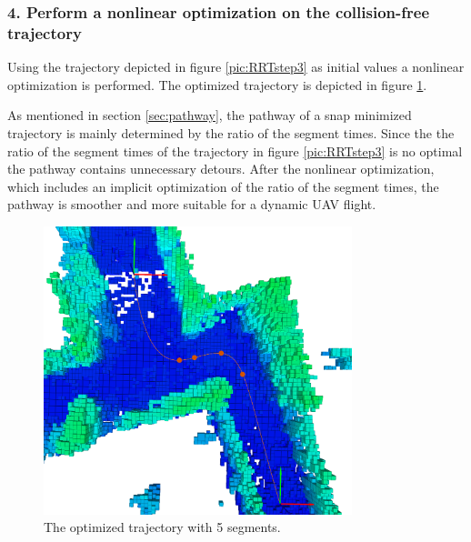 


\subsubsection{4. Perform a nonlinear optimization on the collision-free trajectory}

Using the trajectory depicted in figure \ref{pic:RRTstep3} as initial values a nonlinear optimization is performed. The optimized trajectory is depicted in figure \ref{pic:RRTstep4}. \newline


As mentioned in section \ref{sec:pathway}, the pathway of a snap minimized trajectory is mainly determined by the ratio of the segment times. Since the the ratio of the segment times of the trajectory in figure \ref{pic:RRTstep3} is no optimal the pathway contains unnecessary detours. \newline
After the nonlinear optimization, which includes an implicit optimization of the ratio of the segment times, the pathway is smoother and more suitable for a dynamic UAV flight.


\begin{figure}[h]
   \centering
   \includegraphics[trim = 45mm 0mm 35mm 0mm, clip,width=0.8\textwidth]{pics/extensionCLongP.png}
   \caption{The optimized trajectory with 5 segments.}
\label{pic:RRTstep4}
\end{figure}

